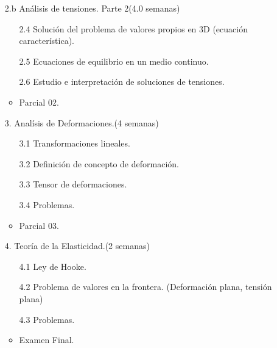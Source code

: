 \begin{itemize}
\begin{itemize}
		\item[2.b] Análisis de tensiones. Parte 2(4.0 semanas)
		\begin{itemize}			
			\item[2.4] Solución del problema de valores propios en 3D (ecuación característica).
			\item[2.5] Ecuaciones de equilibrio en un medio continuo.
			\item[2.6] Estudio e interpretación de soluciones de tensiones.
			\item Parcial 02.
		\end{itemize}
		\item[3.] Analísis de Deformaciones.(4 semanas)
		\begin{itemize}
			\item[3.1] Transformaciones lineales.
			\item[3.2] Definición de concepto de deformación.
			\item[3.3] Tensor de deformaciones.
			\item[3.4] Problemas.
			\item Parcial 03.		
		\end{itemize}
		\item[4.] Teoría de la Elasticidad.(2 semanas)
		\begin{itemize}
		\item[4.1] Ley de Hooke.
		\item[4.2] Problema de valores en la frontera. (Deformación plana, tensión plana)
		\item[4.3] Problemas.
		\item Examen Final.
		\end{itemize}
	\end{itemize}
%
\end{itemize}	
%


